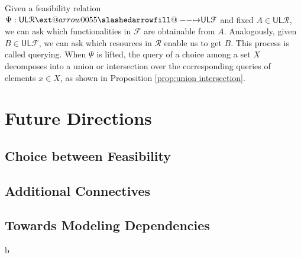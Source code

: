 \documentclass[12pt]{article}
\makeatletter
\theoremstyle{definition}
\theoremstyle{plain}
\theoremstyle{plain}
\theoremstyle{plain}
\theoremstyle{plain}
\theoremstyle{remark}
\theoremstyle{remark}
\newcommand{\mc}[1]{\mathcal{#1}}
\newcommand{\low}{\mathsf{L}}
\newcommand{\upper}{\mathsf{U}}
\def\slashedarrowfill@#1#2#3#4#5{%
	$\m@th\thickmuskip0mu\medmuskip\thickmuskip\thinmuskip\thickmuskip
	\relax#5#1\mkern-7mu%
	\cleaders\hbox{$#5\mkern-2mu#2\mkern-2mu$}\hfill
	\mathclap{#3}\mathclap{#2}%
	\cleaders\hbox{$#5\mkern-2mu#2\mkern-2mu$}\hfill
	\mkern-7mu#4$%
}
\def\rightslashedarrowfill@{%
	\slashedarrowfill@\relbar\relbar\mapstochar\rightarrow}
\newcommand\xslashedrightarrow[2][]{%
	\ext@arrow 0055{\rightslashedarrowfill@}{#1}{#2}}
\makeatother
\begin{document}
\begin{tcolorbox}[title=Queries on Induced Feasibility, colframe=Apricot, colback = paleorange, coltitle = Sepia]
	Given a feasibility relation $\Psi: \upper\low\mc{R} \xslashedrightarrow{} \upper\low\mc{F}$ and fixed $A \in \upper\low\mc{R}$, we can ask which functionalities in $\mc{F}$ are obtainable from $A$. Analogously, given $B \in \upper\low\mc{F}$, we can ask which resources in $\mc{R}$ enable us to get $B$. 
	This process is called querying. When $\Psi$ is lifted, the query of a choice among a set $X$ decomposes into a union or intersection over the corresponding queries of elements $x \in X$, as shown in Proposition \ref{prop:union intersection}.
\end{tcolorbox}

\section{Future Directions}

\subsection{Choice between Feasibility}


\subsection{Additional Connectives}


\subsection{Towards Modeling Dependencies}\label{sec:dependencies}
b

\appendix


\printbibliography
\end{document}
